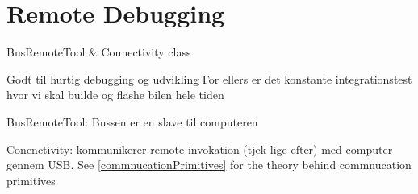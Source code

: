 \section{Remote Debugging} \label{Test:RemoteDebugging}
BusRemoteTool \& Connectivity class

Godt til hurtig debugging og udvikling
For ellers er det konstante integrationstest hvor vi skal builde og flashe bilen hele tiden

BusRemoteTool: Bussen er en slave til computeren

Conenctivity: kommunikerer remote-invokation (tjek lige efter) med computer gennem USB. See  \ref{commnucationPrimitives} for the theory behind commnucation primitives

